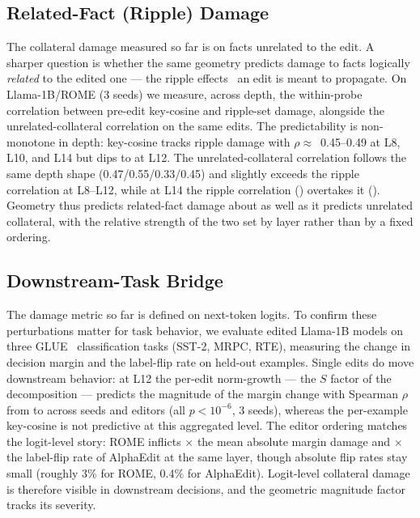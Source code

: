\subsection{Related-Fact (Ripple) Damage}
\label{sec:generality-ripple}
The collateral damage measured so far is on facts unrelated to the edit. A
sharper question is whether the same geometry predicts damage to facts
logically \emph{related} to the edited one --- the ripple
effects~\citep{cohen2024ripple} an edit is meant to propagate. On Llama-1B/ROME (3 seeds) we measure, across depth, the
within-probe correlation between pre-edit key-cosine and ripple-set damage,
alongside the unrelated-collateral correlation on the same edits. The
predictability is non-monotone in depth: key-cosine tracks ripple damage with
$\rho\approx$~0.45--0.49 at L8, L10, and L14 but dips to \rippleLtwelve{} at
L12. The unrelated-collateral correlation follows the same depth shape
(0.47/0.55/0.33/0.45) and slightly exceeds the ripple correlation at L8--L12,
while at L14 the ripple correlation (\rippleLfourteen{}) overtakes it
(\rippleUnrelLfourteen{}). Geometry thus predicts related-fact damage about as
well as it predicts unrelated collateral, with the relative strength of the
two set by layer rather than by a fixed ordering.

\subsection{Downstream-Task Bridge}
\label{sec:generality-glue}
The damage metric so far is defined on next-token logits. To confirm these
perturbations matter for task behavior, we evaluate edited Llama-1B models on
three GLUE~\citep{wang2019glue} classification tasks (SST-2, MRPC, RTE),
measuring the change in
decision margin and the label-flip rate on held-out examples. Single edits do
move downstream behavior: at L12 the per-edit norm-growth --- the $S$ factor of
the decomposition --- predicts the magnitude of the margin
change with Spearman $\rho$ from \glueNGrhoLo{} to \glueNGrhoHi{} across seeds
and editors (all $p<10^{-6}$, 3 seeds), whereas the per-example key-cosine is
not predictive at this aggregated level. The editor ordering matches the
logit-level story: ROME inflicts \glueDmgRatio{}$\times$ the mean absolute
margin damage and \glueFlipRatio{}$\times$ the label-flip rate of AlphaEdit at
the same layer, though absolute flip rates stay small (roughly 3\% for ROME,
0.4\% for AlphaEdit). Logit-level collateral damage is therefore visible in
downstream decisions, and the geometric magnitude factor tracks its severity.

